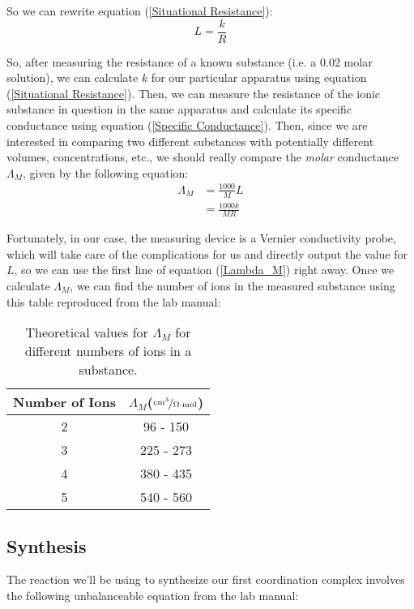 \documentclass{article}
\begin{document}
So we can rewrite equation (\ref{Situational Resistance}):
\begin{equation}\label{Specific Conductance}
L = \frac{k}{R}
\end{equation}

So, after measuring the resistance of a known substance (i.e. a 0.02 molar  solution), we can calculate $k$ for our particular apparatus using equation (\ref{Situational Resistance}). Then, we can measure the resistance of the ionic substance in question in the same apparatus and calculate its specific conductance using equation (\ref{Specific Conductance}). Then, since we are interested in comparing two different substances with potentially different volumes, concentrations, etc., we should really compare the \textit{molar} conductance $\Lambda_M$, given by the following equation:
\begin{equation}\label{Lambda_M}
\begin{aligned}
\Lambda_M &= \frac{1000}{M}L \\
&= \frac{1000k}{MR}
\end{aligned}
\end{equation}

Fortunately, in our case, the measuring device is a Vernier conductivity probe, which will take care of the complications for us and directly output the value for $L$, so we can use the first line of equation (\ref{Lambda_M}) right away. Once we calculate $\Lambda_M$, we can find the number of ions in the measured substance using this table reproduced from the lab manual:

\begin{table}[H]
    \centering
    \begin{tabular}{cc}
        \toprule
        Number of Ions & $\Lambda_M$($\nicefrac{\text{cm}^3}{\Omega\cdot\text{mol}}$) \\
        \midrule
        2 & \phantom{2}96 - 150 \\
        3 & 225 - 273 \\
        4 & 380 - 435 \\
        5 & 540 - 560 \\
        \bottomrule
    \end{tabular}
    \caption{Theoretical values for $\Lambda_M$ for different numbers of ions in a substance.}
\end{table}

\subsection{Synthesis}
The reaction we'll be using to synthesize our first coordination complex involves the following unbalanceable equation from the lab manual:
\end{document}
